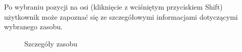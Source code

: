 \documentclass[a4paper]{article}
\begin{document}
Po wybraniu pozycji na osi (kliknięcie z wciśniętym przyciskiem Shift) użytkownik może zapoznać się ze szczegółowymi 
informacjami dotyczącymi wybranego zasobu.
\begin{figure}[H]
    \caption{Szczegóły zasobu}
\end{figure}

\pagebreak
\end{document}
